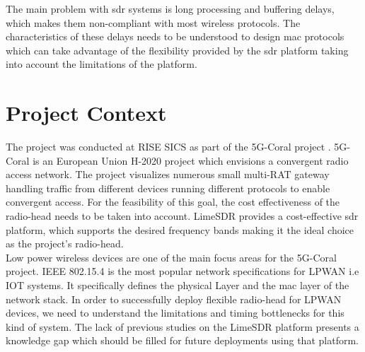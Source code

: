 The main problem with \ac{sdr} systems is long processing and buffering delays, which makes them non-compliant with most wireless protocols.
The characteristics of these delays needs to be understood to design \ac{mac} protocols which can take advantage of the flexibility provided by the \ac{sdr} platform taking into account the limitations of the platform.


\section{Project Context}

The project was conducted at RISE SICS as part of the 5G-Coral project \cite{noauthor_5g-coral_nodate}.
5G-Coral is an European Union H-2020 project which envisions a convergent radio access network.
The project visualizes numerous small multi-\ac{RAT} gateway handling traffic from different devices running different protocols to enable convergent access.
For the feasibility of this goal, the cost effectiveness of the radio-head needs to be taken into account.
LimeSDR \cite{noauthor_limesdr_nodate} provides a cost-effective \ac{sdr} platform, which supports the desired frequency bands making it the ideal choice as the project's radio-head.\\

Low power wireless devices are one of the main focus areas for the 5G-Coral project.
IEEE 802.15.4 is the most popular network specifications for \ac{LPWAN} i.e \ac{IOT} systems.
It specifically defines the physical Layer and the \ac{mac} layer of the network stack.
In order to successfully deploy flexible radio-head for \ac{LPWAN} devices, we need to understand the limitations and timing bottlenecks for this kind of system.
The lack of previous studies on the LimeSDR platform presents a knowledge gap which should be filled for future deployments using that platform.

